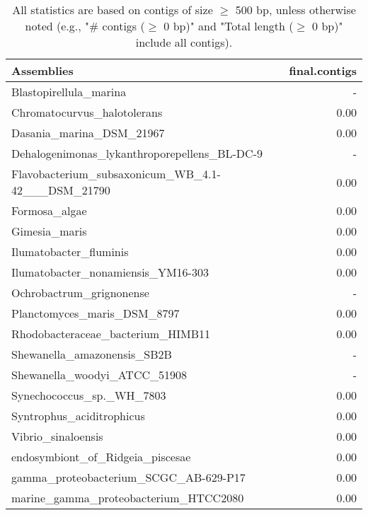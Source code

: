 \documentclass[12pt,a4paper]{article}
\begin{document}
\begin{table}[ht]
\begin{center}
\caption{All statistics are based on contigs of size $\geq$ 500 bp, unless otherwise noted (e.g., "\# contigs ($\geq$ 0 bp)" and "Total length ($\geq$ 0 bp)" include all contigs).}
\begin{tabular}{|l*{1}{|r}|}
\hline
Assemblies & final.contigs \\ \hline
Blastopirellula\_marina & - \\ \hline
Chromatocurvus\_halotolerans & 0.00 \\ \hline
Dasania\_marina\_DSM\_21967 & 0.00 \\ \hline
Dehalogenimonas\_lykanthroporepellens\_BL-DC-9 & - \\ \hline
Flavobacterium\_subsaxonicum\_WB\_4.1-42\_\_\_DSM\_21790 & 0.00 \\ \hline
Formosa\_algae & 0.00 \\ \hline
Gimesia\_maris & 0.00 \\ \hline
Ilumatobacter\_fluminis & 0.00 \\ \hline
Ilumatobacter\_nonamiensis\_YM16-303 & 0.00 \\ \hline
Ochrobactrum\_grignonense & - \\ \hline
Planctomyces\_maris\_DSM\_8797 & 0.00 \\ \hline
Rhodobacteraceae\_bacterium\_HIMB11 & 0.00 \\ \hline
Shewanella\_amazonensis\_SB2B & - \\ \hline
Shewanella\_woodyi\_ATCC\_51908 & - \\ \hline
Synechococcus\_sp.\_WH\_7803 & 0.00 \\ \hline
Syntrophus\_aciditrophicus & 0.00 \\ \hline
Vibrio\_sinaloensis & 0.00 \\ \hline
endosymbiont\_of\_Ridgeia\_piscesae & 0.00 \\ \hline
gamma\_proteobacterium\_SCGC\_AB-629-P17 & 0.00 \\ \hline
marine\_gamma\_proteobacterium\_HTCC2080 & 0.00 \\ \hline
\end{tabular}
\end{center}
\end{table}
\end{document}

